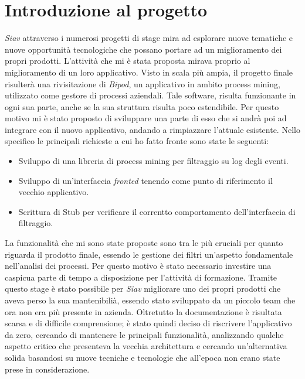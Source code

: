 \section{Introduzione al progetto}
\textit{Siav} attraverso i numerosi progetti di stage mira ad esplorare nuove tematiche e nuove opportunità tecnologiche che possano portare ad un miglioramento dei propri prodotti. L'attività che mi è stata proposta mirava proprio al miglioramento di un loro applicativo. Visto in scala più ampia, il progetto finale risulterà una rivisitazione di \textit{Bipod}, un applicativo in ambito process mining, utilizzato come gestore di processi aziendali.
Tale software, risulta funzionante in ogni sua parte, anche se la sua struttura risulta poco estendibile. Per questo motivo mi è stato proposto di sviluppare una parte di esso che si andrà poi ad integrare con il nuovo applicativo, andando a rimpiazzare l'attuale esistente.
Nello specifico le principali richieste a cui ho fatto fronte sono state le seguenti:
\begin{itemize}
	\item Sviluppo di una libreria di process mining per filtraggio su log degli eventi.
	\item Sviluppo di un'interfaccia \textit{fronted} tenendo come punto di riferimento il vecchio applicativo.
	\item Scrittura di Stub per verificare il correntto comportamento dell'interfaccia di filtraggio.
\end{itemize}
La funzionalità che mi sono state proposte sono tra le più cruciali per quanto riguarda il prodotto finale, essendo le gestione dei filtri un'aspetto fondamentale nell'analisi dei processi. Per questo motivo è stato necessario investire una caspicua parte di tempo a disposizione per l'attività di formazione.
Tramite questo stage è stato possibile per \textit{Siav} migliorare uno dei propri prodotti che aveva perso la sua mantenibilià, essendo stato sviluppato da un piccolo team che ora non era più presente in azienda. Oltretutto la documentazione è risultata scarsa e di difficile comprensione; è stato quindi deciso di riscrivere l'applicativo da zero, cercando di mantenere le principali funzionalità, analizzando qualche aspetto critico che presenteva la vecchia architettura e cercando un'alternativa solida basandosi su nuove tecniche e tecnologie che all'epoca non erano state prese in considerazione. 

